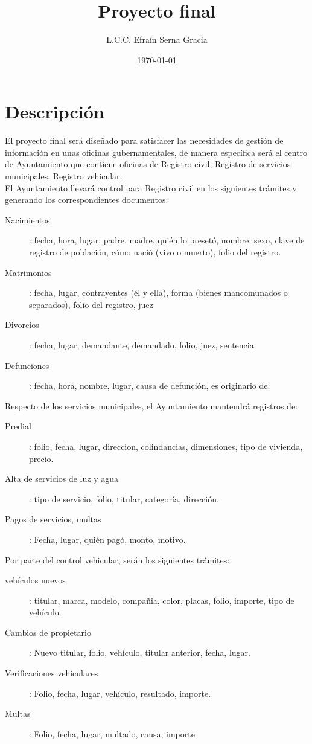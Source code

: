 \documentclass[12pt,spanish,lettersize]{article}
\title{Proyecto final}
\author{L.C.C. Efra\'in Serna Gracia}
\date{\today}
\begin{document}
\maketitle

\section{Descripci\'on}
El proyecto final ser\'a dise\~nado para satisfacer las necesidades de gesti\'on de informaci\'on en unas oficinas gubernamentales, de manera espec\'ifica ser\'a el centro de Ayuntamiento que contiene oficinas de Registro civil, Registro de servicios municipales, Registro vehicular.\\

El Ayuntamiento llevar\'a control para Registro civil en los siguientes tr\'amites y generando los correspondientes documentos:
\begin{description}
\item [Nacimientos]: fecha, hora, lugar, padre, madre, qui\'en lo preset\'o, nombre, sexo, clave de registro de poblaci\'on, c\'omo naci\'o (vivo o muerto), folio del registro.
\item [Matrimonios]: fecha, lugar, contrayentes (\'el y ella), forma (bienes mancomunados o separados), folio del registro, juez
\item [Divorcios]: fecha, lugar, demandante, demandado, folio, juez, sentencia
\item [Defunciones]: fecha, hora, nombre, lugar, causa de defunci\'on, es originario de.
\end{description}

Respecto de los servicios municipales, el Ayuntamiento mantendr\'a registros de:
\begin{description}
\item [Predial]: folio, fecha, lugar, direccion, colindancias, dimensiones, tipo de vivienda, precio.
\item [Alta de servicios de luz y agua]: tipo de servicio, folio, titular, categor\'ia, direcci\'on.
\item [Pagos de servicios, multas]: Fecha, lugar, qui\'en pag\'o, monto, motivo.
\end{description}

Por parte del control vehicular, serán los siguientes trámites:
\begin{description}
\item [veh\'iculos nuevos]: titular, marca, modelo, compa\~nia, color, placas, folio, importe, tipo de veh\'iculo.
\item [Cambios de propietario]: Nuevo titular, folio, veh\'iculo, titular anterior, fecha, lugar.
\item [Verificaciones vehiculares]: Folio, fecha, lugar, veh\'iculo, resultado, importe.
\item [Multas]: Folio, fecha, lugar, multado, causa, importe
\end{description}
\end{document}

